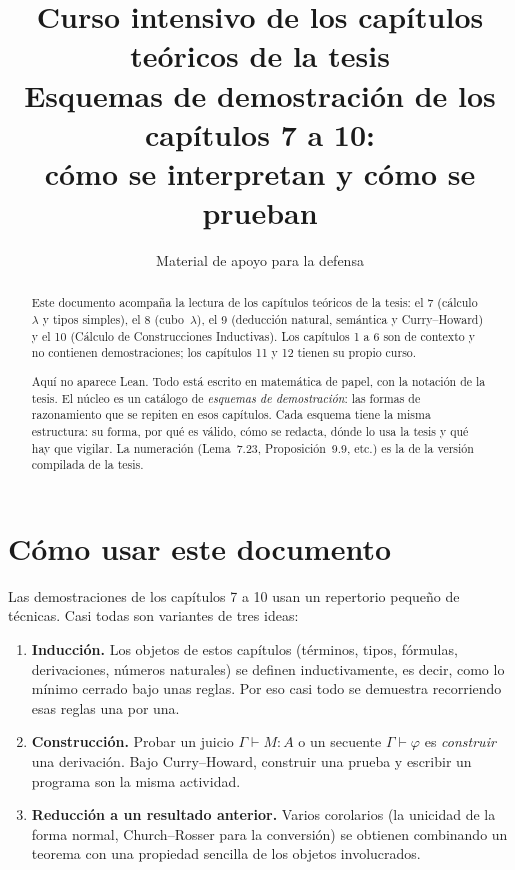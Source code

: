 \documentclass[11pt,a4paper]{article}
\title{\textbf{Curso intensivo de los capítulos teóricos de la tesis}\\[4pt]
  \large Esquemas de demostración de los capítulos 7 a 10:\\
  cómo se interpretan y cómo se prueban}
\author{Material de apoyo para la defensa}
\date{}
\begin{document}
\maketitle
\thispagestyle{empty}

\begin{abstract}
\noindent
Este documento acompaña la lectura de los capítulos teóricos de la tesis:
el 7 (cálculo~\(\lambda\) y tipos simples), el 8 (cubo~\(\lambda\)), el 9
(deducción natural, semántica y Curry--Howard) y el 10 (Cálculo de
Construcciones Inductivas). Los capítulos 1 a 6 son de contexto y no
contienen demostraciones; los capítulos 11 y 12 tienen su propio curso.

Aquí no aparece Lean. Todo está escrito en matemática de papel, con la
notación de la tesis. El núcleo es un catálogo de \emph{esquemas de
demostración}: las formas de razonamiento que se repiten en esos capítulos.
Cada esquema tiene la misma estructura: su forma, por qué es válido, cómo se
redacta, dónde lo usa la tesis y qué hay que vigilar. La numeración (Lema~7.23,
Proposición~9.9, etc.) es la de la versión compilada de la tesis.
\end{abstract}

\tableofcontents
\newpage

\section{Cómo usar este documento}

Las demostraciones de los capítulos 7 a 10 usan un repertorio pequeño de
técnicas. Casi todas son variantes de tres ideas:

\begin{enumerate}
  \item \textbf{Inducción.} Los objetos de estos capítulos (términos, tipos,
    fórmulas, derivaciones, números naturales) se definen inductivamente, es
    decir, como lo mínimo cerrado bajo unas reglas. Por eso casi todo se
    demuestra recorriendo esas reglas una por una.
  \item \textbf{Construcción.} Probar un juicio \(\Gamma\vdash M:A\) o un
    secuente \(\Gamma\vdash\varphi\) es \emph{construir} una derivación. Bajo
    Curry--Howard, construir una prueba y escribir un programa son la misma
    actividad.
  \item \textbf{Reducción a un resultado anterior.} Varios corolarios (la
    unicidad de la forma normal, Church--Rosser para la conversión) se
    obtienen combinando un teorema con una propiedad sencilla de los objetos
    involucrados.
\end{enumerate}
\end{document}
